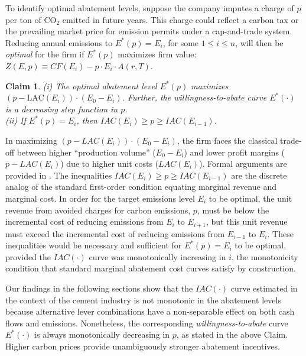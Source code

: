 \documentclass[12pt, a4paper]{article} %
\newtheorem{claim}{Claim}
\newcommand{\methods}{\nameref{sec: methods}} %
\begin{document}
To identify optimal abatement levels, suppose the company imputes a charge of $p$ per ton of CO$_2$ emitted in future years. This charge could reflect a carbon tax or the prevailing market price for emission permits under a cap-and-trade system. Reducing annual emissions to $E^*(p)= E_i$, for some $1\leq i \leq n$, will then be \emph{optimal} for the firm if $E^*(p)$ maximizes firm value: $Z(E, p) \equiv CF(E_i) - p\cdot E_i \cdot A(r,T)$.

\begin{claim}
\label{cl: profit-max}
(i) The optimal abatement level $E^*(p)$ maximizes $(p - \text{LAC}(E_i)) \cdot (E_0 - E_i)$. Further, the willingness-to-abate curve $E^*(\cdot)$ is a decreasing step function in $p$. \\ (ii) If $E^*(p) = E_i$, then $IAC(E_{i}) \geq p \geq IAC(E_{i-1})$.
\end{claim}

In maximizing $(p -LAC(E_i)) \cdot (E_0- E_i)$, the firm faces the classical trade-off between higher ``production volume''  ($E_0- E_i$) and lower profit margins ($p - LAC(E_i)$) due to higher unit costs ($LAC(E_i)$). Formal arguments are provided in  \methods. The inequalities $IAC(E_{i}) \geq p \geq IAC(E_{i-1})$ are the discrete analog of the standard first-order condition equating marginal revenue and marginal cost. In order for the target emissions level $E_i$ to be optimal, the unit revenue from avoided charges for carbon emissions, $p$, must be below the incremental cost of reducing emissions from $E_{i}$ to $E_{i+1}$, but this unit revenue must exceed the incremental cost of reducing emissions from $E_{i-1}$ to $E_i$. These inequalities would be necessary and sufficient for $E^*(p)=E_i$ to be optimal, provided the $IAC(\cdot)$ curve was monotonically increasing in $i$, the monotonicity condition that standard marginal abatement cost curves satisfy by construction.

Our findings in the following sections show that the $IAC(\cdot)$ curve estimated in the context of the cement industry is not monotonic in the abatement levels because alternative lever combinations have a non-separable effect on both cash flows and emissions. Nonetheless, the corresponding \emph{willingness-to-abate} curve $E^*(\cdot)$ is always monotonically decreasing in $p$, as stated in the above Claim. Higher carbon prices provide unambiguously stronger abatement incentives.


\end{document}
